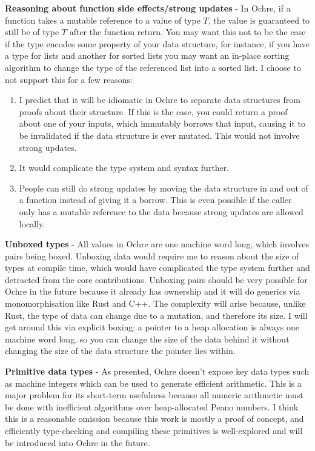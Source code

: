 \documentclass[12pt,twoside]{report}
\begin{document}
\textbf{Reasoning about function side effects/strong updates} - In Ochre, if a function takes a mutable reference to a value of type $T$, the value is guaranteed to still be of type $T$ after the function return. You may want this not to be the case if the type encodes some property of your data structure, for instance, if you have a type for lists and another for sorted lists you may want an in-place sorting algorithm to change the type of the referenced list into a sorted list. I choose to not support this for a few reasons:
\begin{enumerate}
  \item I predict that it will be idiomatic in Ochre to separate data structures from proofs about their structure. If this is the case, you could return a proof about one of your inputs, which immutably borrows that input, causing it to be invalidated if the data structure is ever mutated. This would not involve strong updates.
  \item It would complicate the type system and syntax further.
  \item People can still do strong updates by moving the data structure in and out of a function instead of giving it a borrow. This is even possible if the caller only has a mutable reference to the data because strong updates are allowed locally.
\end{enumerate}

\textbf{Unboxed types} - All values in Ochre are one machine word long, which involves pairs being boxed. Unboxing data would require me to reason about the size of types at compile time, which would have complicated the type system further and detracted from the core contributions. Unboxing pairs should be very possible for Ochre in the future because it already has ownership and it will do generics via monomorphisation like Rust and C++. The complexity will arise because, unlike Rust, the type of data can change due to a mutation, and therefore its size. I will get around this via explicit boxing: a pointer to a heap allocation is always one machine word long, so you can change the size of the data behind it without changing the size of the data structure the pointer lies within.

\textbf{Primitive data types} - As presented, Ochre doesn't expose key data types such as machine integers which can be used to generate efficient arithmetic. This is a major problem for its short-term usefulness because all numeric arithmetic must be done with inefficient algorithms over heap-allocated Peano numbers. I think this is a reasonable omission because this work is mostly a proof of concept, and efficiently type-checking and compiling these primitives is well-explored and will be introduced into Ochre in the future.
\end{document}
